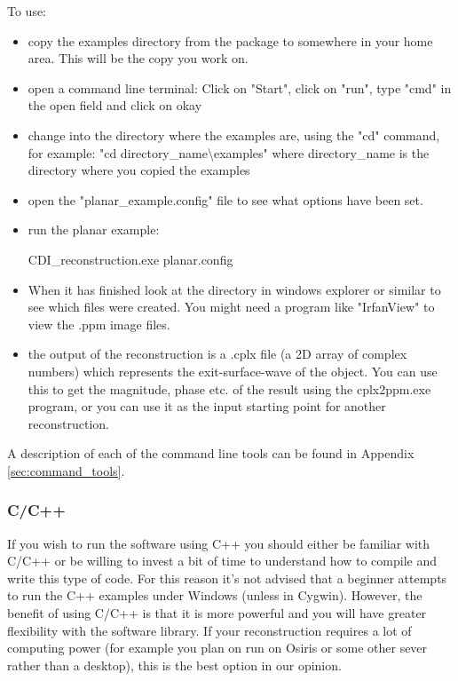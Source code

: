 \documentclass[]{nadia}
\begin{document}
To use:
\begin{itemize}
\item copy the examples directory from the package to somewhere in
  your home area. This will be the copy you work on.
\item open a command line terminal: Click on "Start", click on "run",
  type "cmd" in the open field and click on okay
\item change into the directory where the examples are, using the "cd"
  command, for example: "cd directory\_name\textbackslash examples" where
  directory\_name is the directory where you copied the examples
\item open the "planar\_example.config" file to see what options have
  been set.
\item run the planar example: 
  \begin{myverbatim}
    CDI_reconstruction.exe planar.config
  \end{myverbatim}
\item When it has finished look at the directory in windows explorer
  or similar to see which files were created. You might need a program
  like "IrfanView" to view the .ppm image files.
\item the output of the reconstruction is a .cplx file (a 2D array of
  complex numbers) which represents the exit-surface-wave of the
  object. You can use this to get the magnitude, phase etc. of the
  result using the cplx2ppm.exe program, or you can use it as the
  input starting point for another reconstruction.
\end{itemize}

A description of each of the command line tools can be found 
in Appendix \ref{sec:command_tools}.

\subsubsection{C/C++}

If you wish to run the software using C++ you should either be
familiar with C/C++ or be willing to invest a bit of time to
understand how to compile and write this type of code. For this reason
it's not advised that a beginner attempts to run the C++ examples
under Windows (unless in Cygwin). However, the benefit of using C/C++
is that it is more powerful and you will have greater flexibility with
the software library.  If your reconstruction requires a lot of
computing power (for example you plan on run on Osiris or some other sever rather than a desktop), this is the best option in our opinion.
\end{document}

